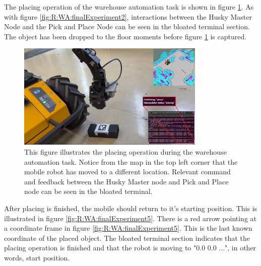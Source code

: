 
The placing operation of the warehouse automation task is shown in figure \ref{fig:R:WA:finalExperiment4}. As with figure \ref{fig:R:WA:finalExperiment2}, interactions between the Husky Master Node and the Pick and Place Node can be seen in the bloated terminal section. The object has been dropped to the floor moments before figure \ref{fig:R:WA:finalExperiment4} is captured.

\begin{figure}[H]
  \centering
  \includegraphics[width = 0.8\textwidth]{Figures/figHuskyFinalExperiment4.png}
  \caption{This figure illustrates the placing operation during the warehouse automation task. Notice from the map in the top left corner that the mobile robot has moved to a different location. Relevant command and feedback between the Husky Master node and Pick and Place node can be seen in the bloated terminal.}
  \label{fig:R:WA:finalExperiment4}
\end{figure}

After placing is finished, the mobile should return to it's starting position. This is illustrated in figure \ref{fig:R:WA:finalExperiment5}. There is a red arrow pointing at a coordinate frame in figure \ref{fig:R:WA:finalExperiment5}. This is the last known coordinate of the placed object. The bloated terminal section indicates that the placing operation is finished and that the robot is moving to "0.0 0.0 ...", in other words, start position.

